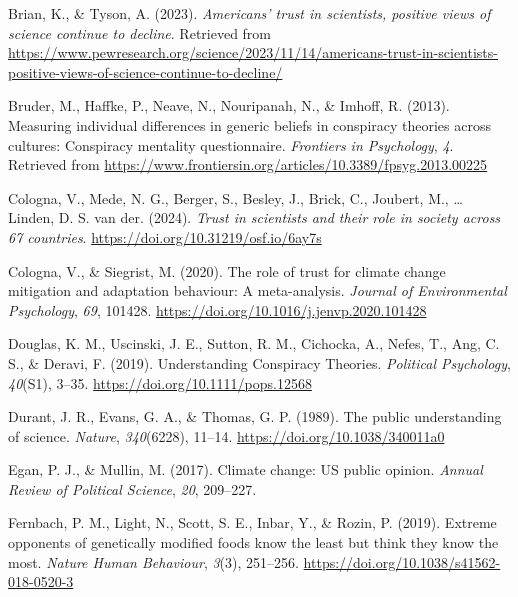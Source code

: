 \documentclass[
  doc,floatsintext]{apa6}
\newlength{\cslhangindent}
\newenvironment{CSLReferences}[2] %
 {\begin{list}{}{%
  \setlength{\itemindent}{0pt}
  \setlength{\leftmargin}{0pt}
  \setlength{\parsep}{0pt}
  \ifodd #1
   \setlength{\leftmargin}{\cslhangindent}
   \setlength{\itemindent}{-1\cslhangindent}
  \fi
  \setlength{\itemsep}{#2\baselineskip}}}
 {\end{list}}
\begin{document}
\begin{CSLReferences}{1}{0}
Brian, K., \& Tyson, A. (2023). \emph{Americans{'} trust in scientists, positive views of science continue to decline}. Retrieved from \url{https://www.pewresearch.org/science/2023/11/14/americans-trust-in-scientists-positive-views-of-science-continue-to-decline/}

Bruder, M., Haffke, P., Neave, N., Nouripanah, N., \& Imhoff, R. (2013). Measuring individual differences in generic beliefs in conspiracy theories across cultures: Conspiracy mentality questionnaire. \emph{Frontiers in Psychology}, \emph{4}. Retrieved from \url{https://www.frontiersin.org/articles/10.3389/fpsyg.2013.00225}

Cologna, V., Mede, N. G., Berger, S., Besley, J., Brick, C., Joubert, M., \ldots{} Linden, D. S. van der. (2024). \emph{Trust in scientists and their role in society across 67 countries}. \url{https://doi.org/10.31219/osf.io/6ay7s}

Cologna, V., \& Siegrist, M. (2020). The role of trust for climate change mitigation and adaptation behaviour: A meta-analysis. \emph{Journal of Environmental Psychology}, \emph{69}, 101428. \url{https://doi.org/10.1016/j.jenvp.2020.101428}

Douglas, K. M., Uscinski, J. E., Sutton, R. M., Cichocka, A., Nefes, T., Ang, C. S., \& Deravi, F. (2019). Understanding Conspiracy Theories. \emph{Political Psychology}, \emph{40}(S1), 3--35. \url{https://doi.org/10.1111/pops.12568}

Durant, J. R., Evans, G. A., \& Thomas, G. P. (1989). The public understanding of science. \emph{Nature}, \emph{340}(6228), 11--14. \url{https://doi.org/10.1038/340011a0}

Egan, P. J., \& Mullin, M. (2017). Climate change: US public opinion. \emph{Annual Review of Political Science}, \emph{20}, 209--227.

Fernbach, P. M., Light, N., Scott, S. E., Inbar, Y., \& Rozin, P. (2019). Extreme opponents of genetically modified foods know the least but think they know the most. \emph{Nature Human Behaviour}, \emph{3}(3), 251--256. \url{https://doi.org/10.1038/s41562-018-0520-3}


\end{CSLReferences}
\end{document}
